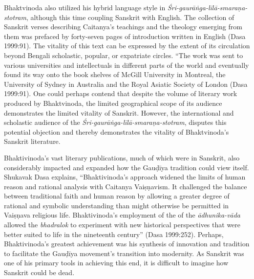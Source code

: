 Bhaktvinoda also utilized his hybrid language style in {\sl Śri-gaurāṅga-līlā-smaraṇa-stotram}, although this time coupling Sanskrit with English. The collection of Sanskrit verses describing Caitanya’s teachings and the theology emerging from them was prefaced by forty-seven pages of introduction written in English (Dasa 1999:91). The vitality of this text can be expressed by the extent of its circulation beyond Bengali scholastic, popular, or expatriate circles. “The work was sent to various universities and intellectuals in different parts of the world and eventually found its way onto the book shelves of McGill University in Montreal, the University of Sydney in Australia and the Royal Asiatic Society of London (Dasa 1999:91). One could perhaps contend that despite the volume of literary work produced by Bhaktvinoda, the limited geographical scope of its audience demonstrates the limited vitality of Sanskrit. However, the international and scholastic audience of the {\sl Śri-gaurāṅga-līlā-smaraṇa-stotram}, disputes this potential objection and thereby demonstrates the vitality of Bhaktvinoda’s Sanskrit literature. 
\vskip 2pt

Bhaktivinoda’s vast literary publications, much of which were in Sanskrit, also considerably impacted and expanded how the Gauḍīya tradition could view itself. Shukavak Dasa explains, “Bhaktivinoda’s approach widened the limits of human reason and rational analysis with Caitanya Vaiṣṇavism. It challenged the balance between traditional faith and human reason by allowing a greater degree of rational and symbolic understanding than might otherwise be permitted in Vaiṣṇava religious life. Bhaktivinoda’s employment of the of the {\sl ādhunika-vāda} allowed the {\sl bhadralok} to experiment with new historical perspectives that were better suited to life in the nineteenth century” (Dasa 1999:252). Perhaps, Bhaktivinoda’s greatest achievement was his synthesis of innovation and tradition to facilitate the Gauḍīya movement’s transition into modernity. As Sanskrit was one of his primary tools in achieving this end, it is difficult to imagine how Sanskrit could be dead.
\vskip 2pt

